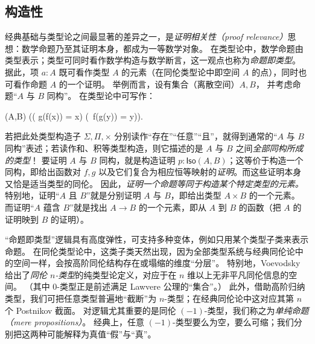 %
%
%
%

\subsection*{构造性}

%

经典基础与类型论之间最显著的差异之一，是\emph{证明相关性（proof relevance）}思想：数学命题乃至其证明本身，都成为一等数学对象。
在类型论中，数学命题由类型表示；类型可同时看作数学构造与数学断言，这一观点也称为\emph{命题即类型}。
%
据此，项 $a : A$ 既可看作类型 $A$ 的元素（在同伦类型论中即空间 $A$ 的点），同时也可看作命题 $A$ 的一个证明。
举例而言，设有集合（离散空间）$A,B$，
%
并考虑命题“$A$ 与 $B$ 同构”。
在类型论中可写作：
\begin{narrowmultline*}
  (A,B)  \narrowbreak
  \Big(\big( g(f(x)) = x\big) \times \big(\, f(g(y)) = y\big)\Big).
\end{narrowmultline*}
%
若把此处类型构造子 $\Sigma, \Pi, \times$ 分别读作“存在”“任意”“且”，就得到通常的“$A$ 与 $B$ 同构”表述；若读作和、积等类型构造，则它描述的是 $A$ 与 $B$ 之间\emph{全部同构所成的类型}！
要证明 $A$ 与 $B$ 同构，就是构造证明 $p : \mathsf{Iso}(A,B)$；这等价于构造一个同构，即给出函数对 $f,g$ 以及它们复合为相应恒等映射的\emph{证明}。而这些证明本身又恰是适当类型的同伦。
因此，\emph{证明一个命题等同于构造某个特定类型的元素。}
特别地，证明“$A$ 且 $B$”就是分别证明 $A$ 与 $B$，即给出类型 $A\times B$ 的一个元素。
而证明“$A$ 蕴含 $B$”就是找出 $A\to B$ 的一个元素，即从 $A$ 到 $B$ 的函数（把 $A$ 的证明映到 $B$ 的证明）。

“命题即类型”逻辑具有高度弹性，可支持多种变体，例如只用某个类型子类来表示命题。
在同伦类型论中，这类子类天然出现，因为全部类型系统与经典同伦论中的空间一样，会按高阶同伦结构存在或塌缩的维度“分层”。
特别地，Voevodsky 给出了\emph{同伦 $n$-类型}的纯类型论定义，对应于在 $n$ 维以上无非平凡同伦信息的空间。
（其中 $0$-类型正是前述满足 Lawvere 公理的“集合”。）
此外，借助高阶归纳类型，我们可把任意类型普遍地“截断”为 $n$-类型；在经典同伦论中这对应其第 $n$ 个 Postnikov 截面。
对逻辑尤其重要的是同伦 $(-1)$-类型，我们称之为\emph{单纯命题（mere propositions）}。
经典上，任意 $(-1)$-类型要么为空，要么可缩；我们分别把这两种可能解释为真值“假”与“真”。

